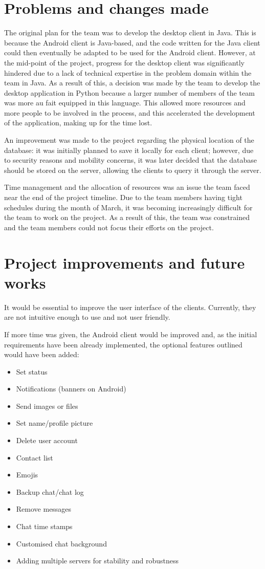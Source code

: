 \documentclass[finalReport.tex]{subfiles}
\begin{document}
\section{Problems and changes made}\label{sec:ev:problems}
The original plan for the team was to develop the desktop client in Java. This is because the Android client is Java-based, and the code written for the Java client could then eventually be adapted to be used for the Android client. However, at the mid-point of the project, progress for the desktop client was significantly hindered due to a lack of technical expertise in the problem domain within the team in Java. As a result of this, a decision was made by the team to develop the desktop application in Python because a larger number of members of the team was more au fait equipped in this language. This allowed more resources and more people to be involved in the process, and this accelerated the development of the application, making up for the time lost.

An improvement was made to the project regarding the physical location of the database: it was initially planned to save it locally for each client; however, due to security reasons and mobility concerns, it was later decided that the database should be stored on the server, allowing the clients to query it through the server.

Time management and the allocation of resources was an issue the team faced near the end of the project timeline. Due to the team members having tight schedules during the month of March, it was becoming increasingly difficult for the team to work on the project. As a result of this, the team was constrained and the team members could not focus their efforts on the project.

\section{Project improvements and future works}\label{sec:ev:future}
It would be essential to improve the user interface of the clients. Currently, they are not intuitive enough to use and not user friendly.

If more time was given, the Android client would be improved and, as the initial requirements have been already implemented, the optional features outlined would have been added:
\begin{itemize}
\item Set status
\item Notifications (banners on Android)
\item Send images or files
\item Set name/profile picture
\item Delete user account
\item Contact list
\item Emojis
\item Backup chat/chat log
\item Remove messages
\item Chat time stamps
\item Customised chat background
\item Adding multiple servers for stability and robustness
\end{itemize}
\end{document}
